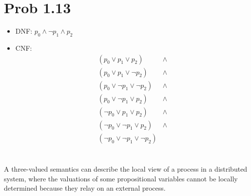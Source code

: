 \documentclass[a4paper]{article}
\begin{document}
\section{Prob 1.13}
\begin{itemize}
\item[] DNF: $p_{0} \wedge \lnot p_{1} \wedge p_{2}$
\item[] CNF:
  \begin{align*}
    (p_{0} \vee p_{1} \vee p_{2}) &\wedge\\
    (p_{0} \vee p_{1} \vee \lnot p_{2}) &\wedge\\
    (p_{0} \vee \lnot p_{1} \vee \lnot p_{2}) &\wedge\\
    (p_{0} \vee \lnot p_{1} \vee p_{2}) &\wedge\\
    (\lnot p_{0} \vee p_{1} \vee p_{2}) &\wedge\\
    (\lnot p_{0} \vee \lnot p_{1} \vee p_{2}) &\wedge\\
    (\lnot p_{0} \vee \lnot p_{1} \vee \lnot p_{2})
  \end{align*}
\end{itemize}

\section{}
A three-valued semantics can describe the local view of a process in a distributed system, where the valuations of some propositional variables cannot be locally determined because they relay on an external process.
\end{document}

